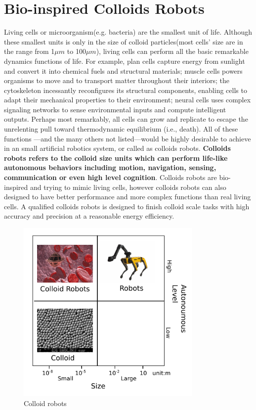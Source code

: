 \section{Bio-inspired Colloids Robots}
Living cells or microorganism(e.g. bacteria) are the smallest unit of life. Although these smallest units is only in the size of colloid particles(most cells' size are in the range from 1$\mu m$ to 100$\mu m$), living cells can perform all the basic remarkable dynamics functions of life. For example, plan cells capture energy from sunlight and convert it into chemical fuels and structural materials; muscle cells powers organisms to move and to transport matter throughout their interiors; the cytoskeleton incessantly reconfigures its structural components, enabling cells to adapt their mechanical properties to their environment; neural cells uses complex signaling networks to sense environmental inputs and compute intelligent outputs. Perhaps most remarkably, all cells can grow and replicate to escape the unrelenting pull toward thermodynamic equilibrium (i.e., death).  All of these functions ---and the many others not listed---would be highly desirable to achieve in an small artificial robotics system, or called as colloids robots. \textbf{Colloids robots refers to the colloid size units which can perform life-like autonomous behaviors including motion, navigation, sensing, communication or even high level cognition}.  Colloids robots are bio-inspired and trying to mimic living cells, however colloids robots can also designed to have better performance and more complex functions than real living cells. A qualified colloids robots is designed to finish colloid scale tasks with high accuracy and precision at a reasonable energy efficiency.

\begin{figure}
\centering
\includegraphics[width=9cm]{figures/1_1.pdf}
\caption{Colloid robots}
\label{fig:1}
\end{figure}

